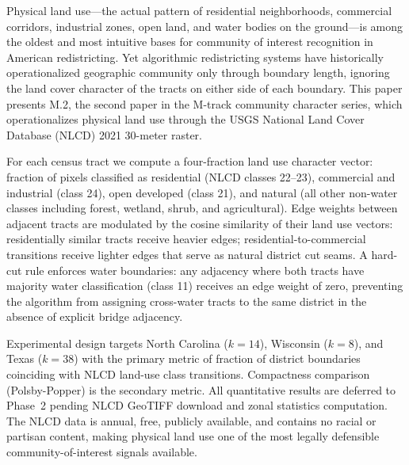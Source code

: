 Physical land use---the actual pattern of residential neighborhoods,
commercial corridors, industrial zones, open land, and water bodies on
the ground---is among the oldest and most intuitive bases for community
of interest recognition in American redistricting.
Yet algorithmic redistricting systems have historically operationalized
geographic community only through boundary length, ignoring the land cover
character of the tracts on either side of each boundary.
This paper presents M.2, the second paper in the M-track community character
series, which operationalizes physical land use through the USGS National
Land Cover Database (NLCD) 2021 30-meter raster.

For each census tract we compute a four-fraction land use character vector:
fraction of pixels classified as residential (NLCD classes 22--23), commercial
and industrial (class 24), open developed (class 21), and natural (all other
non-water classes including forest, wetland, shrub, and agricultural).
Edge weights between adjacent tracts are modulated by the cosine similarity
of their land use vectors: residentially similar tracts receive heavier edges;
residential-to-commercial transitions receive lighter edges that serve as
natural district cut seams.
A hard-cut rule enforces water boundaries: any adjacency where both tracts
have majority water classification (class 11) receives an edge weight of zero,
preventing the algorithm from assigning cross-water tracts to the same district
in the absence of explicit bridge adjacency.

Experimental design targets North Carolina ($k=14$), Wisconsin ($k=8$), and
Texas ($k=38$) with the primary metric of fraction of district boundaries
coinciding with NLCD land-use class transitions.
Compactness comparison (Polsby-Popper) is the secondary metric.
All quantitative results are deferred to Phase~2 pending NLCD GeoTIFF
download and zonal statistics computation.
The NLCD data is annual, free, publicly available, and contains no
racial or partisan content, making physical land use one of the most
legally defensible community-of-interest signals available.
